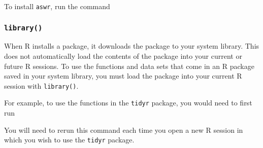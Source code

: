 To install \texttt{aswr}, run the command

\begin{Shaded}
\begin{Highlighting}[]
\NormalTok{(}\NormalTok{)}
\end{Highlighting}
\end{Shaded}

\subsubsection{\texorpdfstring{\texttt{library()}}{library()}}

When R installs a package, it downloads the package to your system
library. This does not automatically load the contents of the package
into your current or future R sessions. To use the functions and data
sets that come in an R package saved in your system library, you must
load the package into your current R session with \texttt{library()}.

For example, to use the functions in the \texttt{tidyr} package, you
would need to first run

\begin{Shaded}
\begin{Highlighting}[]
\NormalTok{(}\NormalTok{)}
\end{Highlighting}
\end{Shaded}

You will need to rerun this command each time you open a new R session
in which you wish to use the \texttt{tidyr} package.
